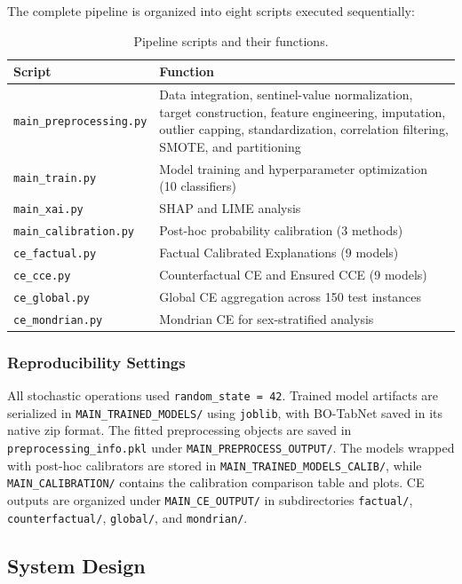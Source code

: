 The complete pipeline is organized into eight scripts executed sequentially:

\begin{table}[H]
\centering
\caption{Pipeline scripts and their functions.}
\label{tab:scripts}
\begin{tabular}{p{4.8cm}p{7.5cm}}
\hline
\textbf{Script} & \textbf{Function} \\
\hline
\texttt{main\_preprocessing.py} & Data integration, sentinel-value normalization, target construction, feature engineering, imputation, outlier capping, standardization, correlation filtering, SMOTE, and partitioning \\
\texttt{main\_train.py} & Model training and hyperparameter optimization (10 classifiers) \\
\texttt{main\_xai.py} & SHAP and LIME analysis \\
\texttt{main\_calibration.py} & Post-hoc probability calibration (3 methods) \\
\texttt{ce\_factual.py} & Factual Calibrated Explanations (9 models) \\
\texttt{ce\_cce.py} & Counterfactual CE and Ensured CCE (9 models) \\
\texttt{ce\_global.py} & Global CE aggregation across 150 test instances \\
\texttt{ce\_mondrian.py} & Mondrian CE for sex-stratified analysis \\
\hline
\end{tabular}
\end{table}

\subsubsection{Reproducibility Settings}

All stochastic operations used \texttt{random\_state = 42}. Trained model artifacts are serialized in \texttt{MAIN\_TRAINED\_MODELS/} using \texttt{joblib}, with BO-TabNet saved in its native zip format. The fitted preprocessing objects are saved in \texttt{preprocessing\_info.pkl} under \texttt{MAIN\_PREPROCESS\_OUTPUT/}. The models wrapped with post-hoc calibrators are stored in \texttt{MAIN\_TRAINED\_MODELS\_CALIB/}, while \texttt{MAIN\_CALIBRATION/} contains the calibration comparison table and plots. CE outputs are organized under \texttt{MAIN\_CE\_OUTPUT/} in subdirectories \texttt{factual/}, \texttt{counterfactual/}, \texttt{global/}, and \texttt{mondrian/}.


\subsection{System Design}

